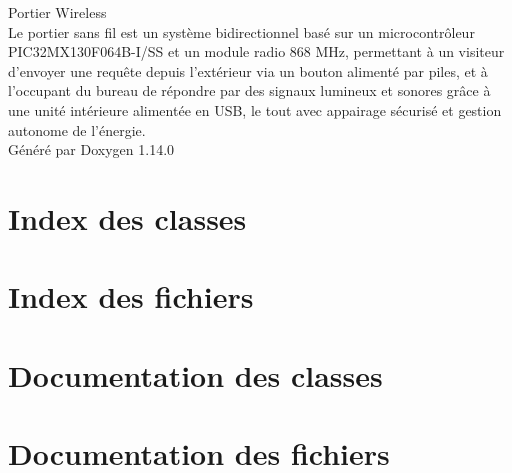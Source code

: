 \documentclass[twoside]{book}
\newcommand{\+}{\discretionary{\mbox{\scriptsize$\hookleftarrow$}}{}{}}
\newcommand{\clearemptydoublepage}{%
    \newpage{\pagestyle{empty}\cleardoublepage}%
  }
\begin{document}
  \raggedbottom
    \hypersetup{pageanchor=false,
                bookmarksnumbered=true,
                pdfencoding=unicode
               }
  \begin{titlepage}
  \vspace*{7cm}
  \begin{center}%
  {\Large Portier Wireless}\\
  [1ex]\large Le portier sans fil est un système bidirectionnel basé sur un microcontrôleur PIC32\+MX130\+F064\+B-\/\+I/\+SS et un module radio 868 MHz, permettant à un visiteur d’envoyer une requête depuis l’extérieur via un bouton alimenté par piles, et à l’occupant du bureau de répondre par des signaux lumineux et sonores grâce à une unité intérieure alimentée en USB, le tout avec appairage sécurisé et gestion autonome de l’énergie. \\
  \vspace*{1cm}
  {\large Généré par Doxygen 1.14.0}\\
  \end{center}
  \end{titlepage}
  \clearemptydoublepage
  \tableofcontents
  \clearemptydoublepage
  \hypersetup{pageanchor=true}
\chapter{Index des classes}

\chapter{Index des fichiers}

\chapter{Documentation des classes}




\chapter{Documentation des fichiers}

























  \backmatter
  \newpage
  \clearemptydoublepage
  \printindex
\end{document}
